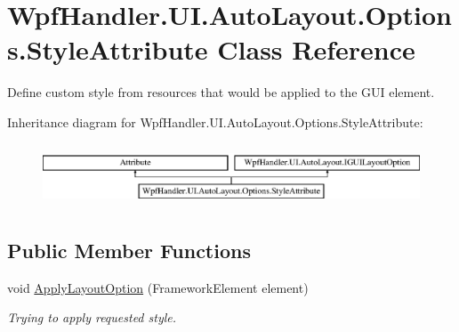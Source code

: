 \hypertarget{class_wpf_handler_1_1_u_i_1_1_auto_layout_1_1_options_1_1_style_attribute}{}\section{Wpf\+Handler.\+U\+I.\+Auto\+Layout.\+Options.\+Style\+Attribute Class Reference}
\label{class_wpf_handler_1_1_u_i_1_1_auto_layout_1_1_options_1_1_style_attribute}


Define custom style from resources that would be applied to the G\+UI element.  


Inheritance diagram for Wpf\+Handler.\+U\+I.\+Auto\+Layout.\+Options.\+Style\+Attribute\+:\begin{figure}[H]
\begin{center}
\leavevmode
\includegraphics[height=1.891892cm]{d4/db4/class_wpf_handler_1_1_u_i_1_1_auto_layout_1_1_options_1_1_style_attribute}
\end{center}
\end{figure}
\subsection*{Public Member Functions}
\begin{DoxyCompactItemize}
\item 
void \mbox{\hyperlink{class_wpf_handler_1_1_u_i_1_1_auto_layout_1_1_options_1_1_style_attribute_a4507ba7b9729b527b0c4f57bffaac0be}{Apply\+Layout\+Option}} (Framework\+Element element)
\begin{DoxyCompactList}\small\item\em Trying to apply requested style. \end{DoxyCompactList}\end{DoxyCompactItemize}

